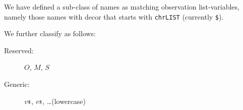 We have defined a sub-class of names as matching observation list-variables,
namely those names with decor that starts with \texttt{chrLIST} (currently
\texttt\$).

We further classify as follows:
\begin{description}
  \item[Reserved:]  $O$, $M$, $S$
  \item[Generic:] ${v}{\scriptstyle\$}$, ${e}{\scriptstyle\$}$, \ldots (lowercase)
\end{description}
